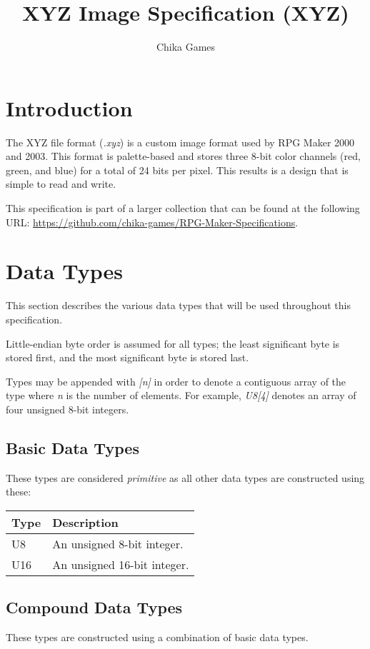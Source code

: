 

\title{XYZ Image Specification (XYZ)}
\author{Chika Games}


\specpreamble

\section{Introduction}
The XYZ file format (\textit{.xyz}) is a custom image format used by RPG Maker 2000 and 2003. This format is palette-based and stores three 8-bit color channels (red, green, and blue) for a total of 24 bits per pixel. This results is a design that is simple to read and write.

This specification is part of a larger collection that can be found at the following URL: \url{https://github.com/chika-games/RPG-Maker-Specifications}.

\section{Data Types}
This section describes the various data types that will be used throughout this specification.

Little-endian byte order is assumed for all types; the least significant byte is stored first, and the most significant byte is stored last.

Types may be appended with \textit{[n]} in order to denote a contiguous array of the type where \textit{n} is the number of elements. For example, \textit{U8[4]} denotes an array of four unsigned 8-bit integers.

\subsection{Basic Data Types}
These types are considered \textit{primitive} as all other data types are constructed using these:

\begin{table}[h!]
\centering
\begin{tabular}{|l|l|}
\hline
\textbf{Type} & \textbf{Description}        \\ \hline
U8            & An unsigned 8-bit integer.  \\ \hline
U16           & An unsigned 16-bit integer. \\ \hline
\end{tabular}
\end{table}

\subsection{Compound Data Types}
These types are constructed using a combination of basic data types.

